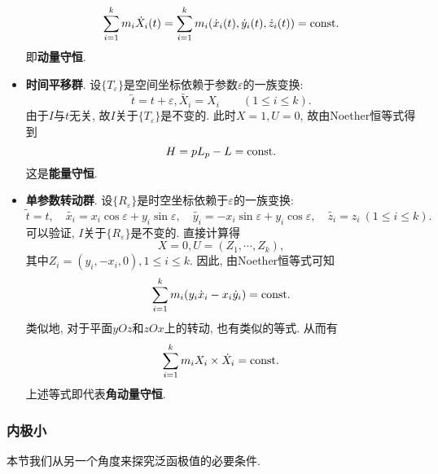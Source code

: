 \begin{example}
\begin{itemize}
\begin{equation*}
            \sum_{i = 1}^km_i\dot X_i(t) = \sum_{i = 1}^km_i(\dot x_i(t), \dot y_i(t), \dot z_i(t)) = {\rm const}.
        \end{equation*}
        即\textbf{动量守恒}.
        \item \textbf{时间平移群}. 设$\{T_{\varepsilon}\}$是空间坐标依赖于参数$\varepsilon$的一族变换:
        \begin{equation*}
            \widetilde{t} = t + \varepsilon, \widetilde{X_i} = X_i \qquad (1 \leq i \leq k).
        \end{equation*}
        由于$I$与$t$无关, 故$I$关于$\{T_{\varepsilon}\}$是不变的. 此时$X = 1, U = 0$, 故由Noether恒等式得到
        \begin{equation*}
            H = pL_p - L = {\rm const}. 
        \end{equation*}
        这是\textbf{能量守恒}.
        \item \textbf{单参数转动群}. 设$\{R_{\varepsilon}\}$是时空坐标依赖于$\varepsilon$的一族变换:
        \begin{equation*}
            \widetilde{t} = t, \quad \widetilde{x_i} = x_i\cos\varepsilon + y_i\sin\varepsilon, \quad \widetilde{y_i} = -x_i\sin\varepsilon + y_i\cos\varepsilon, \quad \widetilde{z_i} = z_i \ (1 \leq i \leq k).
        \end{equation*}
        可以验证, $I$关于$\{R_{\varepsilon}\}$是不变的. 直接计算得
        \begin{equation*}
            X = 0, U = (Z_1, \cdots, Z_k), 
        \end{equation*}
        其中$Z_i= (y_i, -x_i, 0), 1 \leq i \leq k$. 因此, 由Noether恒等式可知
        \begin{equation*}
            \sum_{i = 1}^km_i(y_i\dot x_i - x_i\dot y_i) = {\rm const}. 
        \end{equation*}
        类似地, 对于平面$yOz$和$zOx$上的转动, 也有类似的等式. 从而有
        \begin{equation*}
            \sum_{i = 1}^km_i X_i \times \dot X_i = {\rm const}.
        \end{equation*}
        上述等式即代表\textbf{角动量守恒}.
    \end{itemize}
\end{example}

\subsubsection{内极小}

本节我们从另一个角度来探究泛函极值的必要条件.

